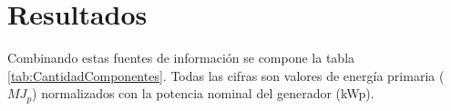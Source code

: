 


\section{Resultados}


Combinando estas fuentes de información se compone la tabla
\ref{tab:CantidadComponentes}.  Todas las cifras son valores de
energía primaria ($MJ_{p}$) normalizados con la potencia nominal del
generador (kWp).

